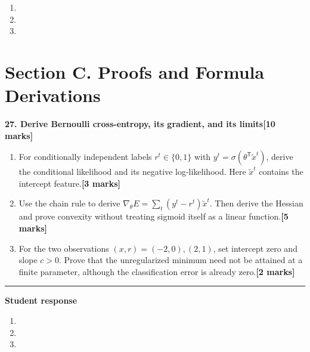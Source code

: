\documentclass[11pt,a4paper]{article}
\newlength{\BlankAnswerHeight}\setlength{\BlankAnswerHeight}{16mm}
\newcommand{\AnswerBlank}{\leavevmode\par\vspace{\BlankAnswerHeight}}
\begin{document}
\begin{enumerate}[label=(\alph*),leftmargin=8mm,itemsep=3pt]
\item
\AnswerBlank
\item
\AnswerBlank
\item
\AnswerBlank
\end{enumerate}
\newpage\section*{Section C. Proofs and Formula Derivations}
\textbf{27. Derive Bernoulli cross-entropy, its gradient, and its limits}\hfill\textbf{[10 marks]}\par\medskip
\begin{enumerate}[label=(\alph*),leftmargin=8mm,itemsep=3pt]
\item For conditionally independent labels \(r^t\in\{0,1\}\) with \(y^t=\sigma(\theta^{\mathsf T}\widetilde x^t)\), derive the conditional likelihood and its negative log-likelihood. Here \(\widetilde x^t\) contains the intercept feature.\hfill\textbf{[3 marks]}
\item Use the chain rule to derive \(\nabla_\theta E=\sum_t(y^t-r^t)\widetilde x^t\). Then derive the Hessian and prove convexity without treating sigmoid itself as a linear function.\hfill\textbf{[5 marks]}
\item For the two observations \((x,r)=(-2,0),(2,1)\), set intercept zero and slope \(c>0\). Prove that the unregularized minimum need not be attained at a finite parameter, although the classification error is already zero.\hfill\textbf{[2 marks]}
\end{enumerate}\par\medskip\hrule\medskip\textbf{Student response}\par
\begin{enumerate}[label=(\alph*),leftmargin=8mm,itemsep=3pt]
\item
\AnswerBlank
\item
\AnswerBlank
\item
\AnswerBlank
\end{enumerate}
\end{document}
